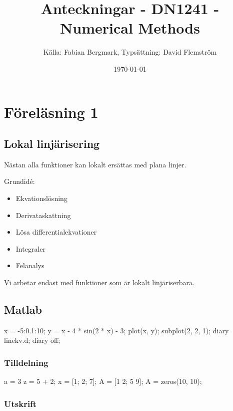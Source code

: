 \documentclass[a4paper,10pt,swedish]{memoir}
\title{Anteckningar - DN1241 - Numerical Methods}
\author{Källa: Fabian Bergmark, Typsättning: David Flemström}
\date{\today}
\numberwithin{equation}{subsection}
\begin{document}
\maketitle

\tableofcontents

\chapter{Föreläsning 1}
\section{Lokal linjärisering}

Nästan alla funktioner kan lokalt ersättas med plana linjer.

Grundidé:

\begin{itemize}
\item Ekvationslösning
\item Derivataskattning
\item Lösa differentialekvationer
\item Integraler
\item Felanalys
\end{itemize}

Vi arbetar endast med funktioner som är lokalt linjäriserbara.

\section{Matlab}

\begin{matlabcode}
x = -5:0.1:10;
y = x - 4 * sin(2 * x) - 3;
plot(x, y);
subplot(2, 2, 1);
diary linekv.d;
diary off;
\end{matlabcode}

\subsection{Tilldelning}

\begin{matlabcode}
a = 3 %
z = 5 + 2;
x = [1; 2; 7]; %
A = [1 2; 5 9];
A = zeros(10, 10); %
\end{matlabcode}

\subsection{Utskrift}
\end{document}
